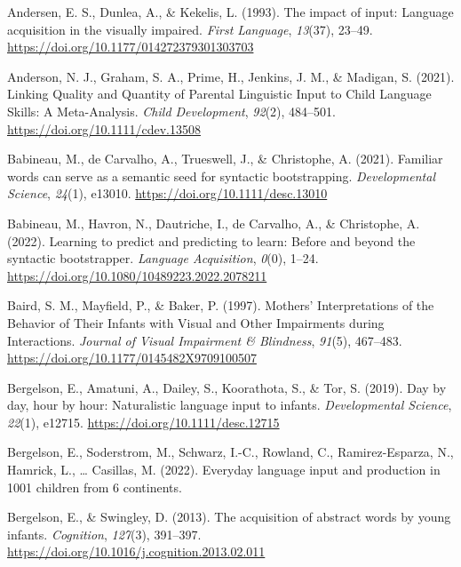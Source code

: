 \documentclass[
  man,floatsintext]{apa6}
\newlength{\cslhangindent}
\newlength{\cslentryspacingunit} %
\newenvironment{CSLReferences}[2] %
 {%
  \setlength{\parindent}{0pt}
  \ifodd #1
  \let\oldpar\par
  \def\par{\hangindent=\cslhangindent\oldpar}
  \fi
  \setlength{\parskip}{#2\cslentryspacingunit}
 }%
 {}
\begin{document}
\hypertarget{refs}{}
\begin{CSLReferences}{1}{0}
\leavevmode{}%
Andersen, E. S., Dunlea, A., \& Kekelis, L. (1993). The impact of input: Language acquisition in the visually impaired. \emph{First Language}, \emph{13}(37), 23--49. \url{https://doi.org/10.1177/014272379301303703}

\leavevmode{}%
Anderson, N. J., Graham, S. A., Prime, H., Jenkins, J. M., \& Madigan, S. (2021). Linking {Quality} and {Quantity} of {Parental Linguistic Input} to {Child Language Skills}: {A Meta-Analysis}. \emph{Child Development}, \emph{92}(2), 484--501. \url{https://doi.org/10.1111/cdev.13508}

\leavevmode{}%
Babineau, M., de Carvalho, A., Trueswell, J., \& Christophe, A. (2021). Familiar words can serve as a semantic seed for syntactic bootstrapping. \emph{Developmental Science}, \emph{24}(1), e13010. \url{https://doi.org/10.1111/desc.13010}

\leavevmode{}%
Babineau, M., Havron, N., Dautriche, I., de Carvalho, A., \& Christophe, A. (2022). Learning to predict and predicting to learn: {Before} and beyond the syntactic bootstrapper. \emph{Language Acquisition}, \emph{0}(0), 1--24. \url{https://doi.org/10.1080/10489223.2022.2078211}

\leavevmode{}%
Baird, S. M., Mayfield, P., \& Baker, P. (1997). Mothers' {Interpretations} of the {Behavior} of {Their Infants} with {Visual} and {Other Impairments} during {Interactions}. \emph{Journal of Visual Impairment \& Blindness}, \emph{91}(5), 467--483. \url{https://doi.org/10.1177/0145482X9709100507}

\leavevmode{}%
Bergelson, E., Amatuni, A., Dailey, S., Koorathota, S., \& Tor, S. (2019). Day by day, hour by hour: {Naturalistic} language input to infants. \emph{Developmental Science}, \emph{22}(1), e12715. \url{https://doi.org/10.1111/desc.12715}

\leavevmode{}%
Bergelson, E., Soderstrom, M., Schwarz, I.-C., Rowland, C., Ramirez-Esparza, N., Hamrick, L., \ldots{} Casillas, M. (2022). Everyday language input and production in 1001 children from 6 continents.

\leavevmode{}%
Bergelson, E., \& Swingley, D. (2013). The acquisition of abstract words by young infants. \emph{Cognition}, \emph{127}(3), 391--397. \url{https://doi.org/10.1016/j.cognition.2013.02.011}


\end{CSLReferences}
\end{document}
